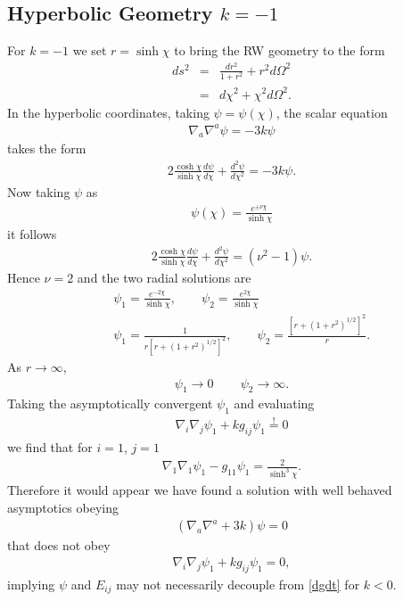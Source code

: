 \documentclass[10pt,letterpaper]{article}
\numberwithin{equation}{section}
\begin{document}
\subsection{Hyperbolic Geometry $k=-1$}
For $k=-1$ we set $r = \sinh\chi$ to bring the RW geometry to the form
\begin{eqnarray}
ds^2 &=& \frac{dr^2}{1+r^2}+r^2d\Omega^2
\nonumber\\
&=& d\chi^2 + \chi^2 d\Omega^2.
\end{eqnarray}
In the hyperbolic coordinates, taking $\psi = \psi(\chi)$, the scalar equation
\begin{eqnarray}
\nabla_a \nabla^a \psi = -3k\psi
\end{eqnarray}
takes the form 
\begin{eqnarray}
2\frac{\cosh\chi}{\sinh\chi}\frac{d\psi}{d\chi} + \frac{d^2\psi}{d\chi^2} = -3k\psi.
\end{eqnarray}
Now taking $\psi$ as
\begin{eqnarray}
\psi(\chi) = \frac{e^{\pm\nu\chi}}{\sinh\chi}
\end{eqnarray}
it follows
\begin{eqnarray}
2\frac{\cosh\chi}{\sinh\chi}\frac{d\psi}{d\chi} + \frac{d^2\psi}{d\chi^2} = (\nu^2-1)\psi.
\end{eqnarray}
Hence $\nu = 2$ and the two radial solutions are
\begin{eqnarray}
&&\psi_1 = \frac{e^{-2\chi}}{\sinh\chi},\qquad \psi_2 = \frac{e^{2\chi}}{\sinh\chi}
\nonumber\\ 
&&\psi_1= \frac{1}{r[r+(1+r^2)^{1/2}]^2},\qquad \psi_2= \frac{[r+(1+r^2)^{1/2}]^2}{r}.
\end{eqnarray}
As $r\to\infty$,
\begin{eqnarray}
\psi_1 \to 0\,\qquad \psi_2 \to \infty.
\end{eqnarray}
Taking the asymptotically convergent $\psi_1$ and evaluating
\begin{eqnarray}
\nabla_i\nabla_j \psi_1 + k g_{ij}\psi_1 \overset{!}{=}0
\end{eqnarray}
we find that for $i=1$, $j=1$
\begin{eqnarray}
\nabla_1\nabla_1 \psi_1 - g_{11}\psi_1 = \frac{2}{\sinh^3\chi}.
\end{eqnarray}
Therefore it would appear we have found a solution with well behaved asymptotics obeying
\begin{eqnarray}
(\nabla_a\nabla^a +3k)\psi = 0
\end{eqnarray}
that does not obey
\begin{eqnarray}
\nabla_i\nabla_j \psi_1 + k g_{ij}\psi_1 =0,
\end{eqnarray}
implying $\psi$ and $E_{ij}$ may not necessarily decouple from \eqref{dgdt} for $k<0$. 
\end{document}
